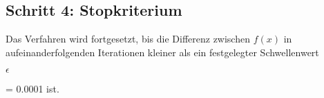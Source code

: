 \documentclass{article}
\begin{document}
\subsection*{Schritt 4: Stopkriterium}

Das Verfahren wird fortgesetzt, bis die Differenz zwischen \( f(x) \) in aufeinanderfolgenden Iterationen kleiner als ein festgelegter Schwellenwert \begin{Large}$ \epsilon $\end{Large} = 0.0001  ist.
\end{document}
